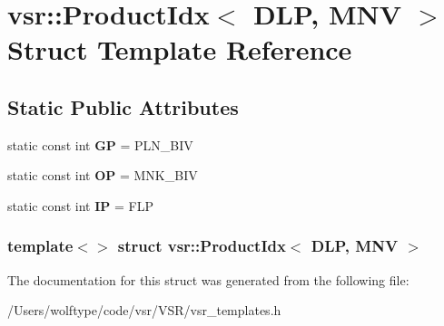\hypertarget{structvsr_1_1_product_idx_3_01_d_l_p_00_01_m_n_v_01_4}{\section{vsr\-:\-:Product\-Idx$<$ D\-L\-P, M\-N\-V $>$ Struct Template Reference}
\label{structvsr_1_1_product_idx_3_01_d_l_p_00_01_m_n_v_01_4}
}
\subsection*{Static Public Attributes}
\begin{DoxyCompactItemize}
\item 
\hypertarget{structvsr_1_1_product_idx_3_01_d_l_p_00_01_m_n_v_01_4_ab5f797c85457623b95e41596f4068f38}{static const int {\bfseries G\-P} = P\-L\-N\-\_\-\-B\-I\-V}\label{structvsr_1_1_product_idx_3_01_d_l_p_00_01_m_n_v_01_4_ab5f797c85457623b95e41596f4068f38}

\item 
\hypertarget{structvsr_1_1_product_idx_3_01_d_l_p_00_01_m_n_v_01_4_ab13ba324b7a4b4441439a9c920d05c4a}{static const int {\bfseries O\-P} = M\-N\-K\-\_\-\-B\-I\-V}\label{structvsr_1_1_product_idx_3_01_d_l_p_00_01_m_n_v_01_4_ab13ba324b7a4b4441439a9c920d05c4a}

\item 
\hypertarget{structvsr_1_1_product_idx_3_01_d_l_p_00_01_m_n_v_01_4_ae692a412795845b411131db56b04d06a}{static const int {\bfseries I\-P} = F\-L\-P}\label{structvsr_1_1_product_idx_3_01_d_l_p_00_01_m_n_v_01_4_ae692a412795845b411131db56b04d06a}

\end{DoxyCompactItemize}
\subsubsection*{template$<$$>$ struct vsr\-::\-Product\-Idx$<$ D\-L\-P, M\-N\-V $>$}



The documentation for this struct was generated from the following file\-:\begin{DoxyCompactItemize}
\item 
/\-Users/wolftype/code/vsr/\-V\-S\-R/vsr\-\_\-templates.\-h\end{DoxyCompactItemize}
